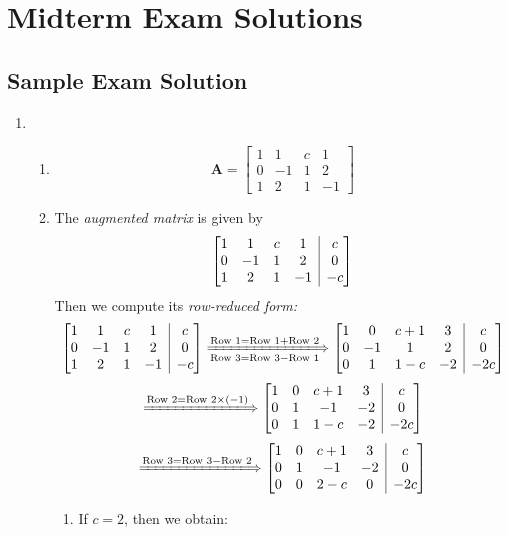\section{Midterm Exam Solutions}
\subsection{Sample Exam Solution}
\begin{enumerate}
\item
\begin{enumerate}
\item
\[
\bm A=\begin{bmatrix}
1&1&c&1\\
0&-1&1&2\\
1&2&1&-1
\end{bmatrix}
\]
\item
The \textit{augmented matrix} is given by
\[
\left[\begin{array}{@{}cccc|c@{}}
1&1&c&1&c\\
0&-1&1&2&0\\
1&2&1&-1&-c
\end{array}\right]
\]
Then we compute its \textit{row-reduced form:}
\[
\left[\begin{array}{@{}cccc|c@{}}
1&1&c&1&c\\
0&-1&1&2&0\\
1&2&1&-1&-c
\end{array}\right]
\xLongrightarrow[\text{Row 3}=\text{Row 3}-\text{Row 1}]{\text{Row 1}=\text{Row 1}+\text{Row 2}}
\left[\begin{array}{@{}cccc|c@{}}
1&0&c+1&3&c\\
0&-1&1&2&0\\
0&1&1-c&-2&-2c
\end{array}\right]
\]
\[
\xLongrightarrow{\text{Row 2}=\text{Row 2}\x(-1)}
\left[\begin{array}{@{}cccc|c@{}}
1&0&c+1&3&c\\
0&1&-1&-2&0\\
0&1&1-c&-2&-2c
\end{array}\right]
\]
\[
\xLongrightarrow{\text{Row 3}=\text{Row 3}-\text{Row 2}}
\left[\begin{array}{@{}cccc|c@{}}
1&0&c+1&3&c\\
0&1&-1&-2&0\\
0&0&2-c&0&-2c
\end{array}\right]
\]
\begin{enumerate}
\item
If $c=2$, then we obtain:

\end{enumerate}
\end{enumerate}
\end{enumerate}
